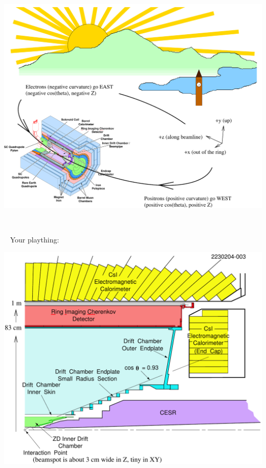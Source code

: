 \documentclass[landscape]{article}
\newenvironment{slide}{\mbox{ }\vfill}{\vfill \mbox{ } \pagebreak}
\begin{document}
\begin{slide}
\begin{center}
\includegraphics[width=0.85\linewidth]{cleo_detector}
\end{center}
\end{slide}

\begin{slide}
Your plaything:

\begin{center}
\includegraphics[width=0.75\linewidth]{quarter_view2}
\end{center}
\end{slide}
\end{document}
